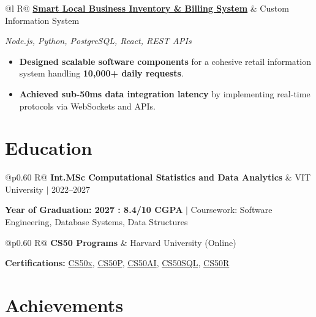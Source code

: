 \documentclass[a4paper,11pt]{article}
\newcommand{\subheading}[1]{\textbf{#1}}
\newcommand{\meta}[1]{{\fontsize{10}{12}\selectfont\textcolor[HTML]{3A3A3A}{#1}}}
\newcommand{\techstack}[1]{{\fontsize{10}{12}\selectfont\textcolor[HTML]{1A1A1A}{\textit{#1}}}}
\newcommand{\ulink}[2]{\href{#1}{#2}}
\begin{document}
\begin{tabularx}{\linewidth}{@{}l R@{}}
\subheading{\ulink{https://github.com/su-jin1425/Smart-Local-Business-Inventory-Billing-System}{Smart Local Business Inventory \& Billing System}} & \meta{Custom Information System}
\end{tabularx}
\techstack{Node.js, Python, PostgreSQL, React, REST APIs}
\begin{itemize}[nosep, leftmargin=1.5em, itemsep=2pt, topsep=2pt]
  \item {\color[HTML]{0A0A0A}\fontsize{11}{14}\selectfont \textbf{Designed scalable software components} for a cohesive retail information system handling \textbf{10,000+ daily requests}.}
  \item {\color[HTML]{0A0A0A}\fontsize{11}{14}\selectfont \textbf{Achieved sub-50ms data integration latency} by implementing real-time protocols via WebSockets and APIs.}
\end{itemize}

\section{Education}
\vspace{2pt}

\begin{tabularx}{\linewidth}{@{}p{0.60\linewidth} R@{}}
\subheading{Int.MSc Computational Statistics and Data Analytics} & \meta{VIT University $|$ 2022--2027}
\end{tabularx}
{\color[HTML]{3A3A3A}\fontsize{11}{14}\selectfont \textbf{Year of Graduation: 2027 : 8.4/10 CGPA} $|$ Coursework: Software Engineering, Database Systems, Data Structures}

\begin{tabularx}{\linewidth}{@{}p{0.60\linewidth} R@{}}
\subheading{CS50 Programs} & \meta{Harvard University (Online)}
\end{tabularx}
{\color[HTML]{3A3A3A}\fontsize{11}{14}\selectfont \textbf{Certifications:} \ulink{https://cs50.harvard.edu/certificates/b14b78df-e05c-413e-a607-1dd27303053a}{CS50x}, \ulink{https://cs50.harvard.edu/certificates/32477052-9db4-49c4-a5a4-d7e58429ca2c}{CS50P}, \ulink{https://cs50.harvard.edu/certificates/9cdb4d4a-1250-4f8e-9fd7-191864e0f919}{CS50AI}, \ulink{https://cs50.harvard.edu/certificates/bc486f24-f085-4e61-8536-80940b97a1b9}{CS50SQL}, \ulink{https://cs50.harvard.edu/certificates/666838e6-a053-4d82-b179-a60fe745fd84}{CS50R}}

\section{Achievements}
\vspace{2pt}
\end{document}
